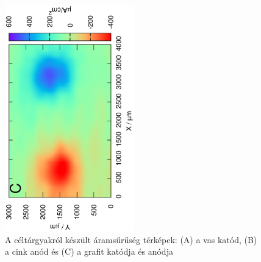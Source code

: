 \begin{figure}
\includegraphics[width=0.5\textwidth, angle=-90]{img/mérések/grafit_h_100.eps}

\caption{A céltárgyakról készült áramsűrűség térképek:
(A) a vas katód, (B) a cink anód és (C) a grafit katódja és anódja}
\label{fig:áramsűrűség}
\end{figure}

